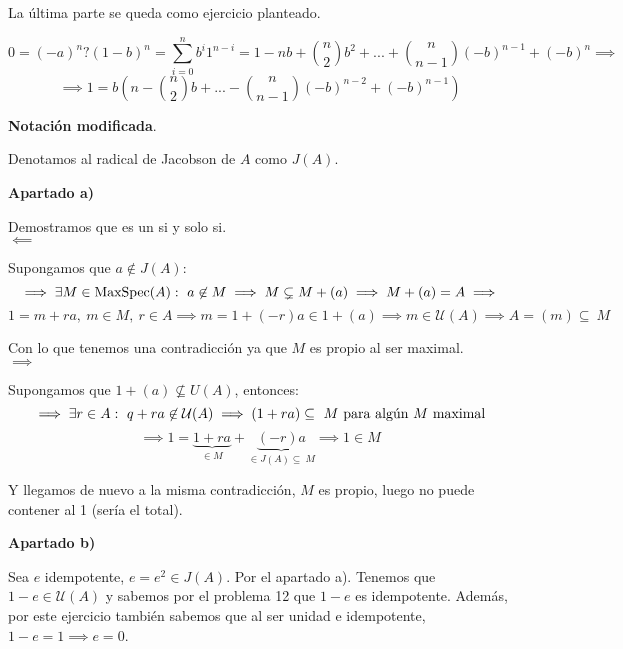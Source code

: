 \documentclass[openany]{book}
\begin{document}
\begin{exercise}
    La última parte se queda como ejercicio planteado.

    $$ 0 = (-a)^{n} ? (1-b)^{n} = \sum\limits_{i=0}^{n}b^{i}1^{n-i} = 1-nb + \binom{n}{2} b^2 +...+\binom{n}{n-1} (-b)^{n-1}+(-b)^{n} \implies $$
    $$\implies 1 = b(n-\binom{n}{2}b+...-\binom{n}{n-1}(-b)^{n-2}+(-b)^{n-1}) $$
    
\end{exercise}

\begin{exercise}
    \textbf{Notación modificada}.

    Denotamos al radical de Jacobson de $ A $ como $ J(A) $.

    \begin{flushright}
        \textbf{Apartado a)}
    \end{flushright}
    
    Demostramos que es un si y solo si.\\
    $ \impliedby $

    Supongamos que $ a \not \in J(A)$:
    $$ \implies \exists M \in \operatornamewithlimits{MaxSpec}(A):\ a \not \in M \implies M \subsetneq M + (a)\implies M +(a) = A \implies$$
    $$ 1 =m+ra,\ m \in M,\ r \in A \implies m = 1+(-r)a \in 1+(a) \implies m \in \mathcal{U}(A) \implies A = (m) \subseteq\ M $$ 

    Con lo que tenemos una contradicción ya que $ M $ es propio al ser maximal.\\
    $ \implies $

    Supongamos que $ 1+(a) \not \subseteq  U(A) $, entonces:
    $$ \implies \exists r \in A:\ q+ra \not \in \mathcal{U}(A) \implies (1+ra) \subseteq\ M\ \text{para algún $ M $ maximal} $$
    $$ \implies 1 = \underbrace{1+ra}_{\in M}+\underbrace{(-r)a}_{\in J(A) \subseteq\ M} \implies 1 \in M  $$

    Y llegamos de nuevo a la misma contradicción, $ M $ es propio, luego no puede contener al 1 (sería el total).

    \begin{flushright}
        \textbf{Apartado b)}
    \end{flushright}
    
    Sea $ e  $ idempotente, $ e = e^2 \in J(A) $. Por el apartado a). Tenemos que $ 1-e \in \mathcal{U}(A) $ y sabemos por el problema 12 que $ 1-e $ es idempotente. Además, por este ejercicio también sabemos que al ser unidad e idempotente, $ 1-e = 1 \implies e = 0 $.

\end{exercise}
\end{document}
